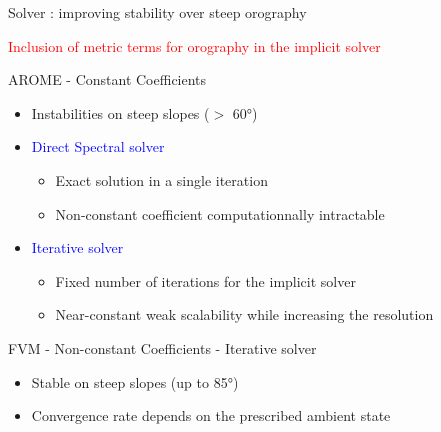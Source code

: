 \documentclass{beamer}
\begin{document}
\begin{frame}{Solver : improving stability over steep orography}

    \textcolor{red}{Inclusion of metric terms for orography in the implicit solver}
    
    \begin{block}{AROME - Constant Coefficients}

        \begin{itemize}
            \item[\textcolor{red}{\faIcon{minus}}] \small Instabilities on steep slopes ($>$ 60°)

            \item \textcolor{blue}{Direct Spectral solver}
            \begin{itemize}
                \item[\textcolor{blue}{\faIcon{plus}}] \small  Exact solution in a single iteration 
                \item[\textcolor{red}{\faIcon{minus}}] \small  Non-constant coefficient computationnally intractable 
            \end{itemize}
            \item \textcolor{blue}{Iterative solver}
            \begin{itemize}
                \item[\textcolor{blue}{\faIcon{plus}}] \small Fixed number of iterations for the implicit solver
                \item[\textcolor{blue}{\faIcon{plus}}] \small Near-constant weak scalability while increasing the resolution
            \end{itemize}
        \end{itemize}
        
    \end{block}

    \begin{block}{FVM - Non-constant Coefficients - Iterative solver}
        \begin{itemize}
            \item[\textcolor{blue}{\faIcon{plus}}] \small Stable on steep slopes (up to 85°) 
            \item[\textcolor{red}{\faIcon{minus}}] \small Convergence rate depends on the prescribed ambient state
        \end{itemize}
    \end{block}
\end{frame}
\end{document}

